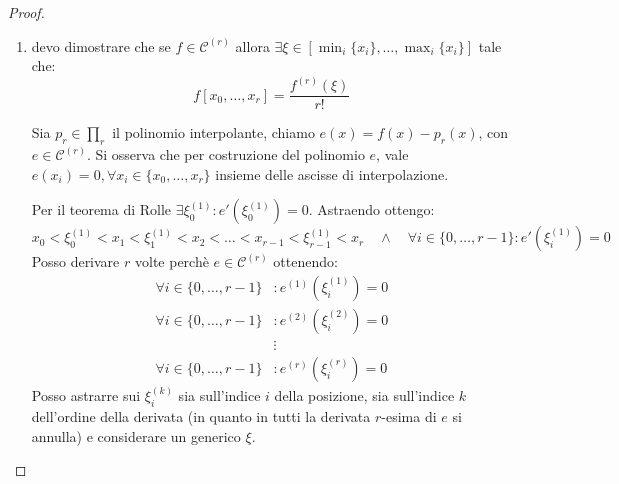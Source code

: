 \begin{proof}
\begin{enumerate}
  \item devo dimostrare che se $f \in \mathcal{C}^{(r)}$ allora $\exists \xi
  \in [\min_{i}\{x_{i}\}, \ldots, \max_{i}\{x_{i}\}]$ tale che:
  \begin{displaymath}
  	f[x_{0}, \ldots, x_{r}] = \frac{f^{(r)}(\xi)}{r!}
  \end{displaymath}
  
  Sia $p_{r} \in \prod_{r}$ il polinomio interpolante, chiamo $e(x) = f(x) -
  p_{r}(x)$, con $e \in \mathcal{C}^{(r)}$. Si osserva che per costruzione del
  polinomio $e$, vale $e(x_{i}) = 0, \forall x_{i} \in \{x_{0}, \ldots, x_{r}\}$
  insieme delle ascisse di interpolazione.
  
  Per il teorema di Rolle $\exists \xi_{0}^{(1)}: e'(\xi_{0}^{(1)}) = 0$.
  Astraendo ottengo:
  \begin{displaymath}
 	x_{0} < \xi_{0}^{(1)} < x_{1} < \xi_{1}^{(1)} < x_{2} < \ldots < x_{r-1} <
 	\xi_{r-1}^{(1)} < x_{r} \quad \wedge \quad \forall i \in \{ 0, \ldots, r-1\}:
 	e'(\xi_{i}^{(1)}) = 0
  \end{displaymath}
  Posso derivare $r$ volte perch\`e $e \in \mathcal{C}^{(r)}$ ottenendo:
  \begin{displaymath}
  \begin{split}
 	\forall i \in \{ 0, \ldots, r-1\}&:	e^{(1)}(\xi_{i}^{(1)}) = 0 \\
 	\forall i \in \{ 0, \ldots, r-1\}&:	e^{(2)}(\xi_{i}^{(2)}) = 0 \\
 	& \vdots \\
 	\forall i \in \{ 0, \ldots, r-1\}&:	e^{(r)}(\xi_{i}^{(r)}) = 0
  \end{split}
  \end{displaymath}
  Posso astrarre sui $\xi_{i}^{(k)}$ sia sull'indice $i$ della posizione, sia
  sull'indice $k$ dell'ordine della derivata (in quanto in tutti la derivata
  $r$-esima di $e$ si annulla) e considerare un generico $\xi$.
  

\end{enumerate}
\end{proof}
